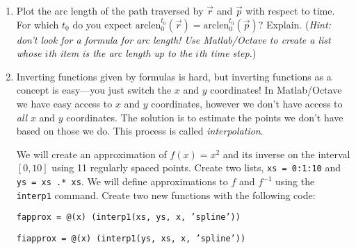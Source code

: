 \documentclass[letter]{article}
\begin{document}
\begin{enumerate}
\begin{enumerate}
					If you have a list {\tt x=[1, 4, 9, 16, 25]}, for example,
					and you would like to get a list of the consecutive
					differences between entries in {\tt x}, you can use the command
					\begin{center}
						{\tt x(:, 2:length(x)) - x(:, 1:(length(x)-1))}
					\end{center}
					If you have a list {\tt vecs} whose \emph{columns} are vectors and you'd like to get a list
					containing the lengths of those vectors, you can use the command
					\begin{center}
						{\tt sqrt(sum(vecs .* vecs, 1))}
					\end{center}
					The extra {\tt 1} in the {\tt sum} command tells {\sc Matlab}/{\sc Octave} to 
					sum along the columns (the command {\tt sum(x, 2)} would sum along the rows).

					\emph{Hint: it will be worth your time to define {\sc Matlab}/{\sc Octave}
						functions for $\vec r$ and $\vec p$ 
					 for use later in the problem.  Also, make sure you
					understand why the example code above works before you use it.}
				\item Plot the arc length of the path traversed by $\vec r$ and $\vec p$ with respect
					to time.  
						For which $t_0$ do you expect $\mathrm{arclen}_0^{t_0}(\vec r) = \mathrm{arclen}_0^{t_0}(\vec p)$?
					Explain.  (\emph{Hint: don't
						look for a formula for arc length!  Use {\sc Matlab}/{\sc Octave} to create a list
					whose $i$th item is the arc length up to the $i$th time step.})
				\item Inverting functions given by formulas is hard, but inverting functions as a concept is 
					easy---you just switch the $x$ and $y$ coordinates!  In {\sc Matlab}/{\sc Octave}
					we have easy access to $x$ and $y$ coordinates, however we don't have access to 
					\emph{all} $x$ and $y$ coordinates.  The solution is to estimate the points we
					don't have based on those we do.  This process is called \emph{interpolation}.

					We will create an approximation of $f(x)=x^2$ and its inverse on the interval
					$[0,10]$ using 11 regularly spaced points.  Create two lists, {\tt xs = 0:1:10}
					and {\tt ys = xs .* xs}. We will define approximations to $f$ and $f^{-1}$ using the 
					{\tt interp1} command.  Create two new functions with the following code:

					{ \tt fapprox = @(x) (interp1(xs, ys, x, 'spline'))
					}
					
					{ \tt fiapprox = @(x) (interp1(ys, xs, x, 'spline'))
					}


\end{enumerate}
\end{enumerate}
\end{document}

